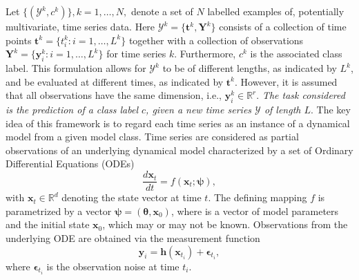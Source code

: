 Let $\{ (\mathcal{Y}^{k},c^{k})\}, k = 1,\ldots,N,$ denote a set of $N$ labelled examples of, potentially multivariate, time series data. 
Here $\mathcal{Y}^{k} = \{ \mathbf{t}^k, \mathbf{Y}^k\}$ consists of a collection of time points $\mathbf{t}^k = \{t_{i}^{k}: i = 1,\ldots, L^{k} \}$ together with a collection of  observations $\mathbf{Y}^k = \{\mathbf{y}_{i}^{k}: i = 1,\ldots, L^{k} \}$ for  time series $k$. Furthermore, $c^{k}$ is the associated class label. 
This formulation allows for  $\mathcal{Y}^{k}$ to be of different lengths, as indicated by $L^{k}$, and be evaluated at different times, as indicated by $\mathbf{t}^k$. 
However, it is assumed that  all observations have the same dimension, i.e., $\mathbf{y}_{i}^{k} \in \mathbb{R}^{r}$. \emph{The task considered is the prediction of a class label $c$, given a new time series $\mathcal{Y}$ of length $L$}. 
The key idea of this framework is to regard each time series as an instance of a dynamical model from a given model class. 
Time series are considered as partial observations of an underlying dynamical model characterized by a set of Ordinary Differential Equations (ODEs)
\begin{equation}\label{eq:dyn_sys}
    \frac{d \mathbf{x}_{t}}{dt} = f(\mathbf{x}_{t};\boldsymbol{\psi}),
\end{equation}
with $\mathbf{x}_{t} \in \mathbb{R}^{d}$ denoting the state vector at time $t$.
The defining mapping $f$ is parametrized by a vector $\boldsymbol{\psi} = (\boldsymbol{\theta}, \mathbf{x}_{0})$, where  is a vector of model parameters and the initial state $\mathbf{x}_{0}$, which may or may not be known.
Observations from the underlying ODE are obtained via the measurement function
\begin{equation}\label{eq:output}
    \mathbf{y}_{i}  = \mathbf{h}(\mathbf{x}_{t_{i}}) + \boldsymbol{\epsilon}_{t_{i}},
\end{equation}
where $\boldsymbol{\epsilon}_{t_{i}}$ is the observation noise at time $t_{i}$. 


